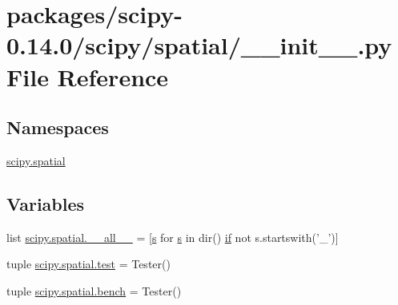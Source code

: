 \hypertarget{packages_2scipy-0_814_80_2scipy_2spatial_2____init_____8py}{}\section{packages/scipy-\/0.14.0/scipy/spatial/\+\_\+\+\_\+init\+\_\+\+\_\+.py File Reference}
\label{packages_2scipy-0_814_80_2scipy_2spatial_2____init_____8py}
\subsection*{Namespaces}
\begin{DoxyCompactItemize}
\item 
 \hyperlink{namespacescipy_1_1spatial}{scipy.\+spatial}
\end{DoxyCompactItemize}
\subsection*{Variables}
\begin{DoxyCompactItemize}
\item 
list \hyperlink{namespacescipy_1_1spatial_a20fc1ad122cc3a448b249c5d924fc5c0}{scipy.\+spatial.\+\_\+\+\_\+all\+\_\+\+\_\+} = \mbox{[}\hyperlink{indexexpr_8h_ae024b0db549122b44c349ae28ec990dc}{s} for \hyperlink{indexexpr_8h_ae024b0db549122b44c349ae28ec990dc}{s} in dir() \hyperlink{minmax_8h_a30a0ee9fee303f01d9c5e6f669e0dfe9}{if} not s.\+startswith('\+\_\+')\mbox{]}
\item 
tuple \hyperlink{namespacescipy_1_1spatial_a9a201637fcd0d98a27b5a6f80349abe2}{scipy.\+spatial.\+test} = Tester()
\item 
tuple \hyperlink{namespacescipy_1_1spatial_a5b7d767a9ff3163062223a0372e4b3fe}{scipy.\+spatial.\+bench} = Tester()
\end{DoxyCompactItemize}
